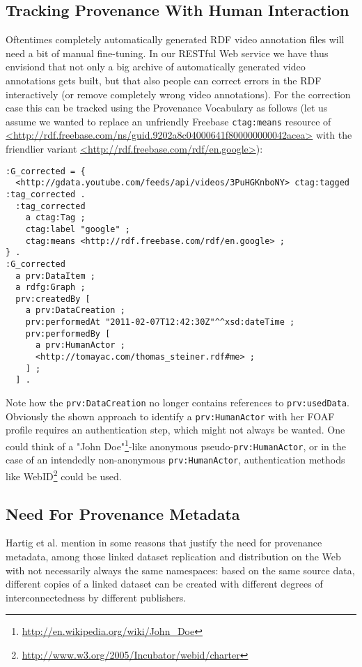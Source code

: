 \documentclass{acm_proc_article-sp}
\begin{document}
\subsection{Tracking Provenance With Human Interaction}\label{sec:human}
Oftentimes completely automatically generated RDF video annotation files will need a bit of manual fine-tuning. In our RESTful Web service we have thus envisiond that not only a big archive of automatically generated video annotations gets built, but that also people can correct errors in the RDF interactively (or remove completely wrong video annotations). For the correction case this can be tracked using the Provenance Vocabulary as follows (let us assume we wanted to replace an unfriendly Freebase \texttt{ctag:means} resource of \url{<http://rdf.freebase.com/ns/guid.9202a8c04000641f800000000042acea>} with the friendlier variant \url{<http://rdf.freebase.com/rdf/en.google>}):
\begin{verbatim}
:G_corrected = {
  <http://gdata.youtube.com/feeds/api/videos/3PuHGKnboNY> ctag:tagged :tag_corrected .
  :tag_corrected
    a ctag:Tag ;
    ctag:label "google" ;
    ctag:means <http://rdf.freebase.com/rdf/en.google> ;
} .
:G_corrected
  a prv:DataItem ;
  a rdfg:Graph ;
  prv:createdBy [
    a prv:DataCreation ;
    prv:performedAt "2011-02-07T12:42:30Z"^^xsd:dateTime ;
    prv:performedBy [
      a prv:HumanActor ;
      <http://tomayac.com/thomas_steiner.rdf#me> ;
    ] ;
  ] .
\end{verbatim}
Note how the \texttt{prv:DataCreation} no longer contains references to \texttt{prv:usedData}. Obviously the shown approach to identify a \texttt{prv:HumanActor} with her FOAF profile requires an authentication step, which might not always be wanted. One could think of a "John Doe"\footnote{\url{http://en.wikipedia.org/wiki/John_Doe}}-like anonymous pseudo-\texttt{prv:HumanActor}, or in the case of an intendedly non-anonymous \texttt{prv:HumanActor}, authentication methods like WebID\footnote{\url{http://www.w3.org/2005/Incubator/webid/charter}} could be used.

\subsection{Need For Provenance Metadata}
Hartig et al. mention in \cite{ipaw10:olaf} some reasons that justify the need for provenance metadata, among those linked dataset replication and distribution on the Web with not necessarily always the same namespaces: based on the same source data, different copies of a linked dataset can be created with different degrees of interconnectedness by different publishers.
\end{document}
